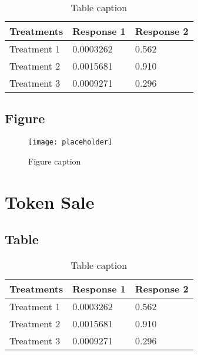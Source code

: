 \documentclass[11pt,fleqn,oneside]{book} %
\begin{document}
\begin{table}[h]
	\centering
	\begin{tabular}{l l l}
		\toprule
		\textbf{Treatments} & \textbf{Response 1} & \textbf{Response 2} \\
		\midrule
		Treatment 1         & 0.0003262           & 0.562               \\
		Treatment 2         & 0.0015681           & 0.910               \\
		Treatment 3         & 0.0009271           & 0.296               \\
		\bottomrule
	\end{tabular}
	\caption{Table caption}
\end{table}


\section{Figure}

\begin{figure}[h]
	\centering\texttt{[image: placeholder]}
	\caption{Figure caption}
\end{figure}




\chapter{Token Sale}

\section{Table}

\begin{table}[h]
	\centering
	\begin{tabular}{l l l}
		\toprule
		\textbf{Treatments} & \textbf{Response 1} & \textbf{Response 2} \\
		\midrule
		Treatment 1         & 0.0003262           & 0.562               \\
		Treatment 2         & 0.0015681           & 0.910               \\
		Treatment 3         & 0.0009271           & 0.296               \\
		\bottomrule
	\end{tabular}
	\caption{Table caption}
\end{table}
\end{document}
